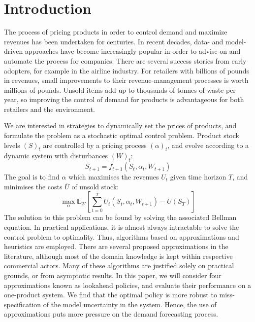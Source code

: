 \documentclass[main.tex]{subfiles}
\begin{document}
\section{Introduction}
The process of pricing products in order to control demand and
maximize revenues has been undertaken for centuries. In recent
decades, data- and model-driven approaches have become increasingly
popular in order to advise on and automate the process for companies.
There are several success stories from early adopters, for example in
the airline industry.
For retailers with billions of pounds in revenues, small
improvements to their revenue-management processes is worth millions
of pounds.
Unsold items add up to thousands of tonnes of waste per year, so
improving the control of demand for products is advantageous
for both retailers and the environment.

We are interested in strategies to dynamically set the prices of products, and
formulate the problem as a stochastic optimal control problem.
Product stock levels $(S)_t$ are controlled by a pricing process
$(\alpha)_t$, and evolve according to a dynamic system with disturbances
$(W)_t$:
\begin{equation}
S_{t+1}=f_{t+1}(S_t,\alpha_t,W_{t+1})
\end{equation}
The goal is to find $\alpha$ which maximises the revenues $U_t$
given time horizon $T$, and
minimises the costs $\overline{U}$ of unsold stock:
\begin{equation}
  \max_{\alpha}\mathbb E_W\left[ \sum_{t=0}^TU_t(S_t,\alpha_t,W_{t+1})
  - \overline{U}(S_T)\right]
\end{equation}
The solution to this problem can be found by solving the associated
Bellman equation. In practical applications, it is almost always
intractable to solve the control problem to optimality.
Thus, algorithms based on approximations and heuristics are employed.
There are several proposed approximations in the
literature, although most of the domain knowledge is kept within
respective commercial actors.
Many of these algorithms are justified solely on practical grounds, or
from asymptotic results.
In this paper, we will consider four approximations known as
lookahead policies,
and evaluate their performance on a one-product system.
We find that the optimal policy is more robust to
miss-specification of the model uncertainty in the system.
Hence, the use of approximations puts more pressure on the
demand forecasting process.
\end{document}
